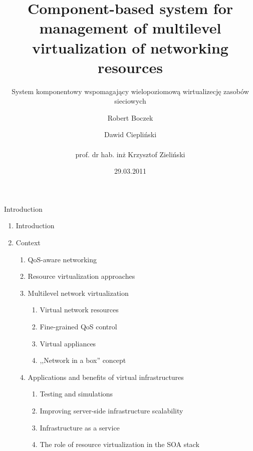 \documentclass{beamer}
\title{Component-based system for management of multilevel virtualization of networking resources}
\subtitle{System komponentowy wspomagający wielopoziomową wirtualizecję zasobów sieciowych}
\author{Robert Boczek \and Dawid Ciepliński \\ ~ \\ prof. dr hab. inż Krzysztof Zieliński}
\date{29.03.2011}
\begin{document}
\begin{frame}

	\titlepage

\end{frame}



\begin{frame}{Introduction}

	\begin{enumerate}

		\item Introduction \pause

		\item Context

			\begin{enumerate}
			
				\item QoS-aware networking \pause
				\item Resource virtualization approaches \pause
				\item Multilevel network virtualization
					
					\begin{enumerate}
						\item Virtual network resources
						\item Fine-grained QoS control
						\item Virtual appliances
						\item ,,Network in a box'' concept
					\end{enumerate}

					\pause

				\item Applications and benefits of virtual infrastructures

					\begin{enumerate}
						\item Testing and simulations
						\item Improving server-side infrastructure scalability
						\item Infrastructure as a service
						\item The role of resource virtualization in the SOA stack
					\end{enumerate}
			
			\end{enumerate}
	
	\end{enumerate}

\end{frame}
\end{document}
